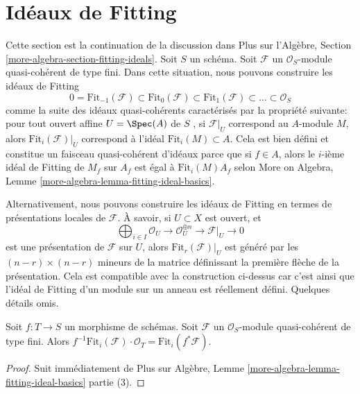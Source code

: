 \section{Idéaux de Fitting}
\label{section-fitting-ideals}

\noindent
Cette section est la continuation de la discussion dans Plus sur l'Algèbre,
Section  \ref{more-algebra-section-fitting-ideals}. Soit  $S$  un schéma. Soit  $\mathcal{F}$  un
 $\mathcal{O}_S$-module quasi-cohérent de type fini. Dans cette situation, nous
pouvons construire les idéaux de Fitting
$$
0 = \text{Fit}_{-1}(\mathcal{F}) \subset \text{Fit}_0(\mathcal{F}) \subset
\text{Fit}_1(\mathcal{F}) \subset \ldots \subset \mathcal{O}_S
$$
comme la suite des idéaux quasi-cohérents caractérisés par la propriété suivante:
pour tout ouvert affine  $U = \Spec(A)$  de  $S$ , si  $\mathcal{F}|_U$  correspond
au  $A$-module  $M$, alors  $\text{Fit}_i(\mathcal{F})|_U$  correspond à l'idéal
 $\text{Fit}_i(M) \subset A$. Cela est bien défini et constitue un faisceau quasi-cohérent
d'idéaux parce que si  $f \in A$, alors le  $i$-ième idéal de Fitting de
 $M_f$  sur  $A_f$  est égal à  $\text{Fit}_i(M) A_f$  selon More on Algebra, Lemme
 \ref{more-algebra-lemma-fitting-ideal-basics}.

\medskip\noindent
Alternativement, nous pouvons construire les idéaux de Fitting en termes de
présentations locales de  $\mathcal{F}$. À savoir, si  $U \subset X$  est ouvert, et
$$
\bigoplus\nolimits_{i \in I} \mathcal{O}_U \to
\mathcal{O}_U^{\oplus n} \to \mathcal{F}|_U \to 0
$$
est une présentation de  $\mathcal{F}$  sur  $U$, alors  $\text{Fit}_r(\mathcal{F})|_U$  est
généré par les  $(n - r) \times (n - r)$ mineurs de la matrice définissant la première flèche
de la présentation. Cela est compatible avec la construction ci-dessus car c'est
ainsi que l'idéal de Fitting d'un module sur un anneau est réellement défini.
Quelques détails omis.

\begin{lemma}
\label{lemma-base-change-fitting-ideal}
Soit  $f : T \to S$  un morphisme de schémas. Soit  $\mathcal{F}$  un
 $\mathcal{O}_S$-module quasi-cohérent de type fini. Alors  $f^{-1}\text{Fit}_i(\mathcal{F}) \cdot \mathcal{O}_T =
\text{Fit}_i(f^*\mathcal{F})$.
\end{lemma}

\begin{proof}
Suit immédiatement de Plus sur Algèbre, Lemme  \ref{more-algebra-lemma-fitting-ideal-basics}  partie (3).
\end{proof}

